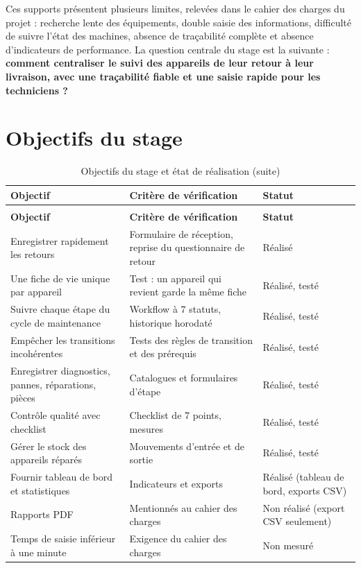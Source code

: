 Ces supports présentent plusieurs limites, relevées dans le cahier des charges du projet : recherche lente des équipements, double saisie des informations, difficulté de suivre l'état des machines, absence de traçabilité complète et absence d'indicateurs de performance. La question centrale du stage est la suivante : \textbf{comment centraliser le suivi des appareils de leur retour à leur livraison, avec une traçabilité fiable et une saisie rapide pour les techniciens ?}

\section{Objectifs du stage}

{\small{}\renewcommand{\arraystretch}{1.3}
\begin{longtable}{|>{\raggedright\arraybackslash}p{4.90cm}|>{\raggedright\arraybackslash}p{5.79cm}|>{\raggedright\arraybackslash}p{3.56cm}|}
\caption{Objectifs du stage et état de réalisation}\\
\hline
\rowcolor{ALbleu} \sffamily\bfseries\color{white} Objectif & \sffamily\bfseries\color{white} Critère de vérification & \sffamily\bfseries\color{white} Statut \\ \hline
\endfirsthead
\caption[]{Objectifs du stage et état de réalisation (suite)}\\
\hline
\rowcolor{ALbleu} \sffamily\bfseries\color{white} Objectif & \sffamily\bfseries\color{white} Critère de vérification & \sffamily\bfseries\color{white} Statut \\ \hline
\endhead
Enregistrer rapidement les retours & Formulaire de réception, reprise du questionnaire de retour & Réalisé \\ \hline
\rowcolor{ALgris} Une fiche de vie unique par appareil & Test : un appareil qui revient garde la même fiche & Réalisé, testé \\ \hline
Suivre chaque étape du cycle de maintenance & Workflow à 7 statuts, historique horodaté & Réalisé, testé \\ \hline
\rowcolor{ALgris} Empêcher les transitions incohérentes & Tests des règles de transition et des prérequis & Réalisé, testé \\ \hline
Enregistrer diagnostics, pannes, réparations, pièces & Catalogues et formulaires d'étape & Réalisé, testé \\ \hline
\rowcolor{ALgris} Contrôle qualité avec checklist & Checklist de 7 points, mesures & Réalisé, testé \\ \hline
Gérer le stock des appareils réparés & Mouvements d'entrée et de sortie & Réalisé, testé \\ \hline
\rowcolor{ALgris} Fournir tableau de bord et statistiques & Indicateurs et exports & Réalisé (tableau de bord, exports CSV) \\ \hline
Rapports PDF & Mentionnés au cahier des charges & Non réalisé (export CSV seulement) \\ \hline
\rowcolor{ALgris} Temps de saisie inférieur à une minute & Exigence du cahier des charges & Non mesuré \\ \hline
\end{longtable}
}

